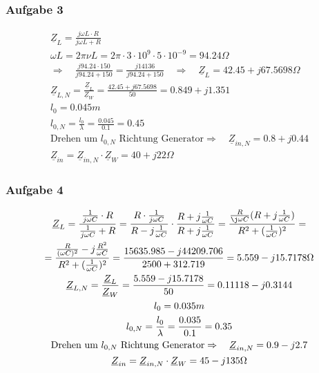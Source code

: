 \documentclass[12pt,a4paper,ngerman]{article}
\begin{document}
\subsubsection{Aufgabe 3}
\begin{gather}
\underline{Z}_L = \frac{j\omega L \cdot R}{j\omega L + R} \\
\omega L = 2 \pi \nu L = 2 \pi \cdot 3 \cdot 10^9 \cdot 5 \cdot 10^{-9} = 94.24 \Omega\\
\Rightarrow \quad \frac{j 94.24 \cdot 150}{j94.24 +150} = \frac{j14136}{j94.24 + 150} \quad \Rightarrow \quad \underline{Z}_{L} = 42.45 + j67.5698 \Omega \\
\underline{Z}_{L,N} = \frac{\underline{Z}_L}{\underline{Z}_W} = \frac{42.45 + j67.5698}{50} = 0.849 + j1.351  \\
l_0 = 0.045m \\
l_{0,N} = \frac{l_0}{\lambda} = \frac{0.045}{0.1} = 0.45 \\
\text{Drehen um }l_{0,N} \text{ Richtung Generator}\Rightarrow \quad \underline{Z}_{in,N} = 0.8+j0.44 \\
\underline{Z}_{in} = \underline{Z}_{in,N} \cdot \underline{Z}_W = 40 + j22 \Omega
\end{gather}

\subsubsection{Aufgabe 4}
\begin{gather}
\underline{Z}_L = \frac{\frac{1}{j \omega C} \cdot R}{\frac{1}{j \omega C} + R} = \frac{R \cdot \frac{1}{j \omega C}}{R-j\frac{1}{\omega C}} \cdot \frac{R+j\frac{1}{\omega C}}{R+j\frac{1}{\omega C}} = \frac{\frac{R}{\j \omega C}(R+j\frac{1}{\omega C})}{R^2 + (\frac{1}{\omega C})^2} =\\
= \frac{\frac{R}{(\omega C)^2} -j\frac{R^2}{\omega C}}{R^2 + (\frac{1}{\omega C})^2} = \frac{15635.985 -j 44209.706}{2500 + 312.719} = 5.559 - j15.7178\Omega\\
\underline{Z}_{L,N} = \frac{\underline{Z}_L}{\underline{Z}_W} = \frac{5.559 - j15.7178}{50} = 0.11118 -j0.3144  \\
l_0 = 0.035m \\
l_{0,N} = \frac{l_0}{\lambda} = \frac{0.035}{0.1} = 0.35 \\
\text{Drehen um }l_{0,N} \text{ Richtung Generator}\Rightarrow \quad \underline{Z}_{in,N} = 0.9 -j2.7 \\
\underline{Z}_{in} = \underline{Z}_{in,N} \cdot \underline{Z}_W = 45-j135 \Omega
\end{gather}
\end{document}
